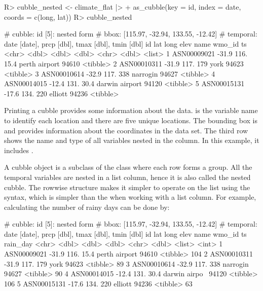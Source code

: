 \documentclass[
]{jss}
\begin{document}
\begin{CodeChunk}
\begin{CodeInput}
R> cubble_nested <- climate_flat |>
+   as_cubble(key = id, index = date, coords = c(long, lat))
R> cubble_nested
\end{CodeInput}
\begin{CodeOutput}
# cubble:   id [5]: nested form
# bbox:     [115.97, -32.94, 133.55, -12.42]
# temporal: date [date], prcp [dbl], tmax [dbl], tmin [dbl]
  id            lat  long  elev name           wmo_id ts      
  <chr>       <dbl> <dbl> <dbl> <chr>           <dbl> <list>  
1 ASN00009021 -31.9  116.  15.4 perth airport   94610 <tibble>
2 ASN00010311 -31.9  117. 179   york            94623 <tibble>
3 ASN00010614 -32.9  117. 338   narrogin        94627 <tibble>
4 ASN00014015 -12.4  131.  30.4 darwin airport  94120 <tibble>
5 ASN00015131 -17.6  134. 220   elliott         94236 <tibble>
\end{CodeOutput}
\end{CodeChunk}

Printing a cubble provides some information about the data.  is the variable name to identify each location and there are five unique locations. The bounding box is \code{[115.97, -32.94, 133.55, -12.42]} and provides information about the coordinates in the data set. The third row shows the name and type of all variables nested in the  column. In this example, it includes .

A cubble object is a subclass of the  class where each row forms a group. All the temporal variables are nested in a list column, hence it is also called the nested cubble. The rowwise structure makes it simpler to operate on the list using the  syntax, which is simpler than the  when working with a list column. For example, calculating the number of rainy days can be done by:

\begin{CodeChunk}
\begin{CodeOutput}
# cubble:   id [5]: nested form
# bbox:     [115.97, -32.94, 133.55, -12.42]
# temporal: date [date], prcp [dbl], tmax [dbl], tmin [dbl]
  id            lat  long  elev name          wmo_id ts       rain_day
  <chr>       <dbl> <dbl> <dbl> <chr>          <dbl> <list>      <int>
1 ASN00009021 -31.9  116.  15.4 perth airport  94610 <tibble>      104
2 ASN00010311 -31.9  117. 179   york           94623 <tibble>       89
3 ASN00010614 -32.9  117. 338   narrogin       94627 <tibble>       90
4 ASN00014015 -12.4  131.  30.4 darwin airpo~  94120 <tibble>      106
5 ASN00015131 -17.6  134. 220   elliott        94236 <tibble>       63
\end{CodeOutput}
\end{CodeChunk}
\end{document}

